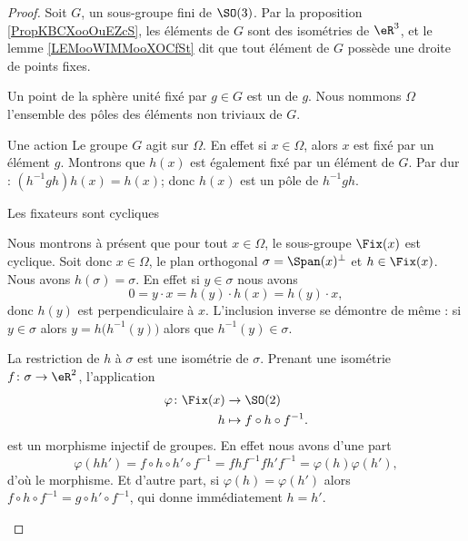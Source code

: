 \begin{proof}
    Soit \( G\), un sous-groupe fini de \( \SO(3)\). Par la proposition \ref{PropKBCXooOuEZcS}, les éléments de \( G\) sont des isométries de \( \eR^3\), et le lemme \ref{LEMooWIMMooXOCfSt} dit que tout élément de \( G\) possède une droite de points fixes.

    Un point de la sphère unité fixé par \( g\in G\) est un  de \( g\). Nous nommons \( \Omega\) l'ensemble des pôles des éléments non triviaux de \( G\).
    \begin{subproof}
        \item[Une action]
            Le groupe \( G\) agit sur \( \Omega\). En effet si \( x\in \Omega\), alors \( x\) est fixé par un élément \( g\). Montrons que \( h(x)\) est également fixé par un élément de \( G\). Par dur : \( (h^{-1}gh)h(x)=h(x)\); donc \( h(x)\) est un pôle de \( h^{-1} gh\).

        \item[Les fixateurs sont cycliques]

            Nous montrons à présent que pour tout \( x\in\Omega\), le sous-groupe \( \Fix(x)\) est cyclique. Soit donc \( x\in\Omega\), le plan orthogonal \( \sigma=\Span(x)^{\perp}\) et \( h\in \Fix(x)\). Nous avons \( h(\sigma)=\sigma\). En effet si \( y\in \sigma\) nous avons 
            \begin{equation}
                0=y\cdot x=h(y)\cdot h(x)=h(y)\cdot x,
            \end{equation}
            donc \( h(y)\) est perpendiculaire à \( x\). L'inclusion inverse se démontre de même : si \( y\in \sigma\) alors \( y=h\big( h^{-1}(y) \big)\) alors que \( h^{-1}(y)\in \sigma\).

            La restriction de \( h\) à \( \sigma\) est une isométrie de \( \sigma\). Prenant une isométrie \( f\colon \sigma\to \eR^2\), l'application
            \begin{equation}
                \begin{aligned}
                    \varphi\colon \Fix(x)&\to \SO(2) \\
                    h&\mapsto f\circ h\circ f^{-1}. 
                \end{aligned}
            \end{equation}
            est un morphisme injectif de groupes. En effet nous avons d'une part
            \begin{equation}
                \varphi(hh')=f\circ h\circ h'\circ f^{-1}=fhf^{-1}fh'f^{-1}=\varphi(h)\varphi(h'),
            \end{equation}
            d'où le morphisme. Et d'autre part, si \( \varphi(h)=\varphi(h')\) alors \( f\circ h\circ f^{-1}=g\circ h'\circ f^{-1}\), qui donne immédiatement \( h=h'\).


\end{subproof}
\end{proof}
